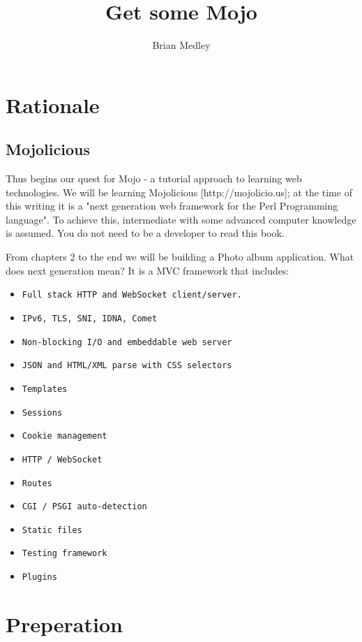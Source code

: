 \documentclass[17pt]{extreport}
\begin{document}
\title{Get some Mojo}
\author{Brian Medley}

\maketitle
\tableofcontents

\chapter*{Rationale}

\section{Mojolicious}

Thus begins our quest for Mojo - a tutorial approach to learning web
technologies. We will be learning Mojolicious [http://mojolicio.us]; at the
time of this writing it is a "next generation web framework for the Perl
Programming language". To achieve this, intermediate with some advanced
computer knowledge is assumed. You do not need to be a developer to read this
book.

From chapters 2 to the end we will be building a Photo album application. What
does next generation mean? It is a MVC framework that includes:

\begin{itemize}
\item \verb|Full stack HTTP and WebSocket client/server.|
\item \verb|IPv6, TLS, SNI, IDNA, Comet|
\item \verb|Non-blocking I/O and embeddable web server|
\item \verb|JSON and HTML/XML parse with CSS selectors|
\item \verb|Templates|
\item \verb|Sessions|
\item \verb|Cookie management|
\item \verb|HTTP / WebSocket|
\item \verb|Routes|
\item \verb|CGI / PSGI auto-detection|
\item \verb|Static files|
\item \verb|Testing framework|
\item \verb|Plugins|
\end{itemize}

\chapter*{Preperation}
\end{document}
